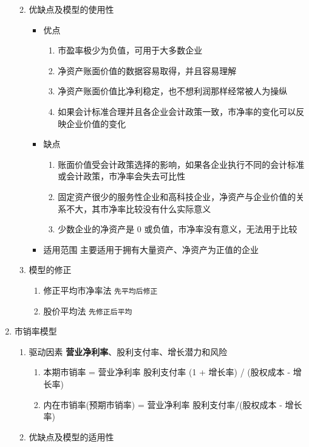 \documentclass[11pt]{article}
\begin{document}
\begin{enumerate}
\begin{enumerate}
\begin{enumerate}
\end{enumerate}
\item 优缺点及模型的使用性
\label{sec:org7aeefdb}
\begin{itemize}
\item 优点
\begin{enumerate}
\item 市盈率极少为负值，可用于大多数企业
\item 净资产账面价值的数据容易取得，并且容易理解
\item 净资产账面价值比净利稳定，也不想利润那样经常被人为操纵
\item 如果会计标准合理并且各企业会计政策一致，市净率的变化可以反映企业价值的变化
\end{enumerate}
\item 缺点
\begin{enumerate}
\item 账面价值受会计政策选择的影响，如果各企业执行不同的会计标准或会计政策，市净率会失去可比性
\item 固定资产很少的服务性企业和高科技企业，净资产与企业价值的关系不大，其市净率比较没有什么实际意义
\item 少数企业的净资产是 0 或负值，市净率没有意义，无法用于比较
\end{enumerate}
\item 适用范围
主要适用于拥有大量资产、净资产为正值的企业
\end{itemize}
\item 模型的修正
\label{sec:org656d9ab}
\begin{enumerate}
\item 修正平均市净率法
\texttt{先平均后修正}
\item 股价平均法
\texttt{先修正后平均}
\end{enumerate}
\end{enumerate}
\item 市销率模型
\label{sec:org57ba825}
\begin{enumerate}
\item 驱动因素
\label{sec:org002e8aa}
\textbf{营业净利率}、股利支付率、增长潜力和风险
\begin{enumerate}
\item 本期市销率 = 营业净利率 \texttimes{} 股利支付率 \texttimes{} (1 + 增长率) / (股权成本 - 增长率)
\item 内在市销率(预期市销率) = 营业净利率 \texttimes{} 股利支付率/(股权成本 - 增长率)
\end{enumerate}
\item 优缺点及模型的适用性
\label{sec:org531372b}

\end{enumerate}
\end{enumerate}
\end{document}
